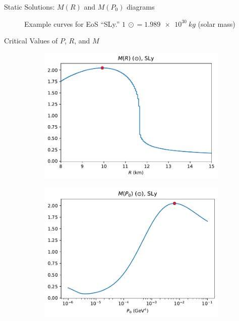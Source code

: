 \documentclass[handout]{beamer}
\begin{document}
\begin{frame}{Static Solutions: $M(R)$ and $M(P_0)$ diagrams}
\begin{figure}[h!]
\begin{subfigure}{.5\textwidth}
            \end{subfigure}
            \caption[]{Example curves for EoS ``SLy.'' $\SI{1}{\odot} = \SI{1.989e+30}{kg}$ (solar mass)}
        \end{figure}
    \end{frame}

    \begin{frame}{Critical Values of $P$, $R$, and $M$}
        \vspace{-10pt}
        \begin{figure}[h!]
            \centering
            \begin{subfigure}{.5\textwidth}
                \includegraphics[width = \textwidth]{r_analysis,SLy.pdf}
            \end{subfigure}%
            \begin{subfigure}{.5\textwidth}
                \includegraphics[width = \textwidth]{p0_analysis,SLy.pdf}

\end{subfigure}
\end{figure}
\end{frame}
\end{document}
